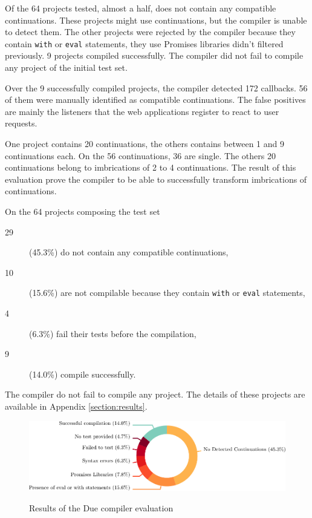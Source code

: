 
Of the 64 projects tested, almost a half, does not contain any compatible continuations.
These projects might use continuations, but the compiler is unable to detect them.
The other projects were rejected by the compiler because they contain \texttt{with} or \texttt{eval} statements, they use Promises libraries didn't filtered previously.
9 projects compiled successfully.
The compiler did not fail to compile any project of the initial test set.

Over the 9 successfully compiled projects, the compiler detected 172 callbacks.
56 of them were manually identified as compatible continuations.
The false positives are mainly the listeners that the web applications register to react to user requests.

One project contains 20 continuations, the others contains between 1 and 9 continuations each.
On the 56 continuations, 36 are single. %
The others 20 continuations belong to imbrications of 2 to 4 continuations.
The result of this evaluation prove the compiler to be able to successfully transform imbrications of continuations.

On the 64 projects composing the test set
\begin{description}
\item[29] (45.3\%) do not contain any compatible continuations,
\item[10] (15.6\%) are not compilable because they contain \texttt{with} or \texttt{eval} statements,
\item[4] (6.3\%) fail their tests before the compilation,
\item[9] (14.0\%) compile successfully.
\end{description}
The compiler do not fail to compile any project.
The details of these projects are available in Appendix \ref{section:results}.

\begin{figure}
  \centering
  \includegraphics[width=\linewidth]{../resources/due-evaluation.pdf}
  \label{fig:due-evaluation}
  \caption{Results of the Due compiler evaluation}
\end{figure}

